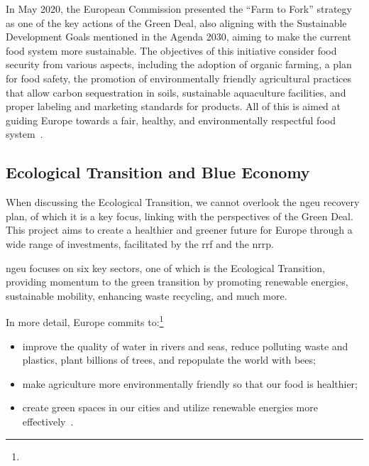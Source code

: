 In May 2020, the European Commission presented the “Farm to Fork” strategy as one of the key actions of the Green Deal, also aligning with the Sustainable Development Goals mentioned in the Agenda 2030, aiming to make the current food system more sustainable. The objectives of this initiative consider food security from various aspects, including the adoption of organic farming, a plan for food safety, the promotion of environmentally friendly agricultural practices that allow carbon sequestration in soils, sustainable aquaculture facilities, and proper labeling and marketing standards for products. All of this is aimed at guiding Europe towards a fair, healthy, and environmentally respectful food system~\parencite{farm_to_fork}.


\subsection{Ecological Transition and Blue Economy}
When discussing the Ecological Transition, we cannot overlook the \gls{ngeu} recovery plan, of which it is a key focus, linking with the perspectives of the Green Deal. This project aims to create a healthier and greener future for Europe through a wide range of investments, facilitated by the \gls{rrf} and the \gls{nrrp}.

\gls{ngeu} focuses on six key sectors, one of which is the Ecological Transition, providing momentum to the green transition by promoting renewable energies, sustainable mobility, enhancing waste recycling, and much more.

In more detail, Europe commits to:\footnote{}
\begin{itemize}
\item improve the quality of water in rivers and seas, reduce polluting waste and plastics, plant billions of trees, and repopulate the world with bees;
\item make agriculture more environmentally friendly so that our food is healthier;
\item create green spaces in our cities and utilize renewable energies more effectively~\parencite{next_gen_eu}.
\end{itemize}

